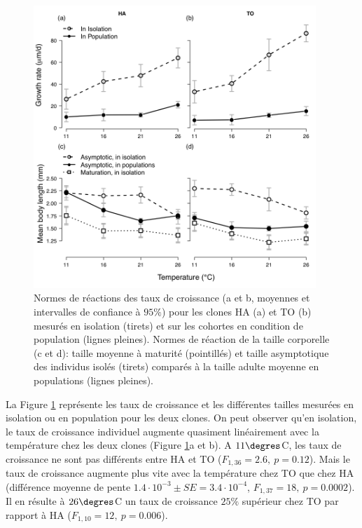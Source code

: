 \begin{figure}[!ht]
\begin{center}
\includegraphics[width=0.95\textwidth]{1_CorpsDeThese/Resumes/Fig/FIP03}
\caption[Normes de réactions des taux
de croissance et tailles moyennes]{Normes de réactions des taux de croissance (a
et b, moyennes et intervalles de confiance à $95\%$) pour les clones HA (a) et TO (b) mesurés en isolation (tirets) et sur les cohortes en condition de population (lignes pleines). Normes
de réaction de la taille corporelle (c et d): taille moyenne à maturité
(pointillés) et taille asymptotique des individus isolés (tirets) comparés à la
taille adulte moyenne en populations (lignes pleines).}
\label{fig:FIP3}
\end{center}
\end{figure}

La Figure \ref{fig:FIP3} représente les taux de croissance et les différentes
tailles mesurées en isolation ou en population pour les deux clones. On peut
observer qu'en isolation, le taux de croissance individuel augmente quasiment
linéairement avec la température chez les deux clones (Figure \ref{fig:FIP3}a
et b). A $11\degres$C, les taux de croissance ne sont pas différents entre HA et
TO ($F_{1,36}=2.6,\ p=0.12$). Mais le taux de croissance augmente plus vite avec
la température chez TO que chez HA (différence moyenne de pente $1.4\cdot
10^{-3} \pm SE=3.4\cdot 10^{-4}$, $F_{1,37}=18,\ p=0.0002$). Il en résulte à
$26\degres$C un taux de croissance $25\%$ supérieur chez TO par rapport à HA
($F_{1,10}=12,\ p=0.006$). 


